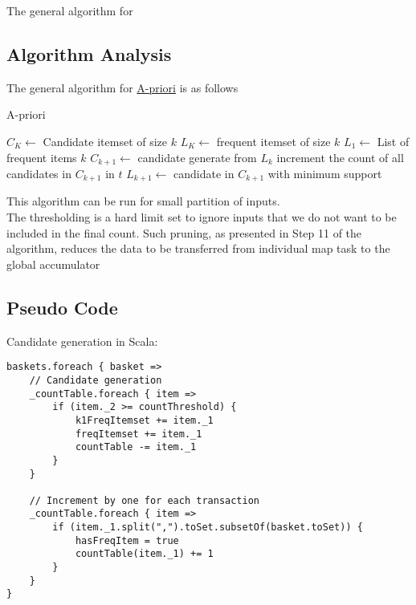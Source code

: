 \documentclass[11pt]{article}
\begin{document}
The general algorithm for 
\subsection {Algorithm Analysis}
The general algorithm for \href{https://www3.cs.stonybrook.edu/~cse634/lecture_notes/07apriori.pdf}{A-priori} is as follows\\
\begin{algorithm}[H]
    \caption{A-priori}

    \begin{algorithmic}[1]
        \State $C_K \gets $ Candidate itemset of size $k$
        \State $L_K \gets $ frequent itemset of size $k$
        \State
        \State $L_1 \gets $ List of frequent items $k$
        \State
            \State $C_{k+1} \gets $ candidate generate from $L_k$
                \State increment the count of all candidates in $C_{k+1}$ in $t$
            \EndFor
            \State $L_{k+1} \gets$ candidate in $C_{k+1}$ with minimum support
        \EndFor
    \end{algorithmic}
\end{algorithm}

This algorithm can be run for small partition of inputs.\\
The thresholding is a hard limit set to ignore inputs that we do not want to be included in the final count. Such pruning, as presented in Step 11 of the algorithm, reduces the data to be transferred from individual map task to the global accumulator

\subsection {Pseudo Code}
Candidate generation in Scala: \\
\begin{lstlisting}
baskets.foreach { basket =>
    // Candidate generation
    _countTable.foreach { item =>
        if (item._2 >= countThreshold) {
            k1FreqItemset += item._1
            freqItemset += item._1
            countTable -= item._1
        }
    }

    // Increment by one for each transaction
    _countTable.foreach { item =>
        if (item._1.split(",").toSet.subsetOf(basket.toSet)) {
            hasFreqItem = true
            countTable(item._1) += 1
        }
    }
}
\end{lstlisting}
\end{document}

